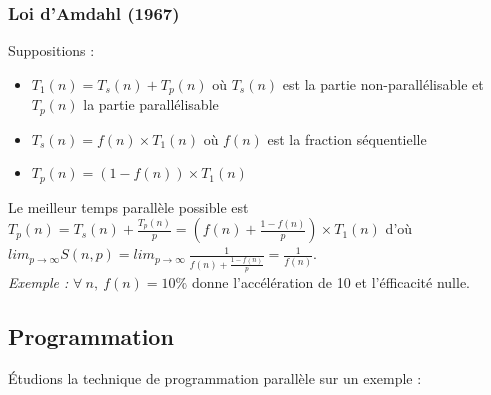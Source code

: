 \documentclass[12pt, a4paper]{article}
\begin{document}
      \subsubsection{Loi d'Amdahl (1967)}
        Suppositions :
        \begin{itemize}
          \item \(T_1(n) = T_s(n) + T_p(n)\) où \(T_s(n)\) est la partie
          non-parallélisable et \(T_p(n)\) la partie parallélisable
          \item \(T_s(n) = f(n) \times T_1(n)\) où \(f(n)\) est la fraction
          séquentielle
          \item \(T_p(n) = (1 - f(n)) \times T_1(n)\)
        \end{itemize}
        Le meilleur temps parallèle possible est \(T_p(n) = T_s(n) +
        \frac{T_p(n)}{p} = (f(n) + \frac{1 - f(n)}{p}) \times T_1(n)\) d'où
        \(lim_{p\to\infty} S(n, p) = lim_{p\to\infty}\  \frac{1}{f(n) +
        \frac{1 - f(n)}{p}} = \frac{1}{f(n)}\). \\
        \indent \textit{Exemple :} \(\forall \ n,\ f(n) = 10\%\) donne
        l'accélération de 10 et l'éfficacité nulle.
    \subsection{Programmation}
      Étudions la technique de programmation parallèle sur un exemple :
\end{document}
